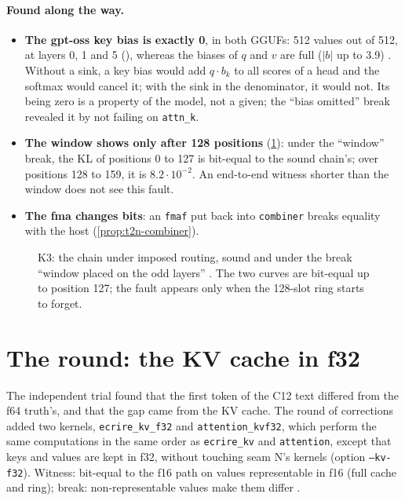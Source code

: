 \paragraph{Found along the way.}
\begin{itemize}
\item \textbf{The gpt-oss key bias is exactly 0}, in both GGUFs: 512 values out of 512, at layers 0, 1 and 5 (), whereas the biases of $q$ and $v$ are full ($|b|$ up to 3.9) \mes. Without a sink, a key bias would add $q \cdot b_k$ to all scores of a head and the softmax would cancel it; with the sink in the denominator, it would not. Its being zero is a property of the model, not a given; the ``bias omitted'' break revealed it by not failing on \texttt{attn\_k}.
\item \textbf{The window shows only after 128 positions} (\cref{fig:t2n-fenetre-kl}): under the ``window'' break, the KL of positions 0 to 127 is bit-equal to the sound chain's; over positions 128 to 159, it is $8.2\cdot10^{-2}$. An end-to-end witness shorter than the window does not see this fault.
\item \textbf{The fma changes bits}: an \texttt{fmaf} put back into \texttt{combiner} breaks equality with the host (\cref{prop:t2n-combiner}).
\end{itemize}

\begin{figure}[!htbp]
\centering
\GrapheNoyFenetre
\caption[K3: the ``window'' break and its step at 128]{K3: the chain under imposed routing, sound and under the break ``window placed on the odd layers'' \mes. The two curves are bit-equal up to position 127; the fault appears only when the 128-slot ring starts to forget.}
\label{fig:t2n-fenetre-kl}
\end{figure}

\section{The round: the KV cache in f32}\label{sec:t2n-kv}

The independent trial found that the first token of the C12 text differed from the f64 truth's, and that the gap came from the KV cache. The round of corrections added two kernels, \texttt{ecrire\_kv\_f32} and \texttt{attention\_kvf32}, which perform the same computations in the same order as \texttt{ecrire\_kv} and \texttt{attention}, except that keys and values are kept in f32, without touching seam N's kernels (option \texttt{--kv-f32}). Witness: bit-equal to the f16 path on values representable in f16 (full cache and ring); break: non-representable values make them differ \mes.

